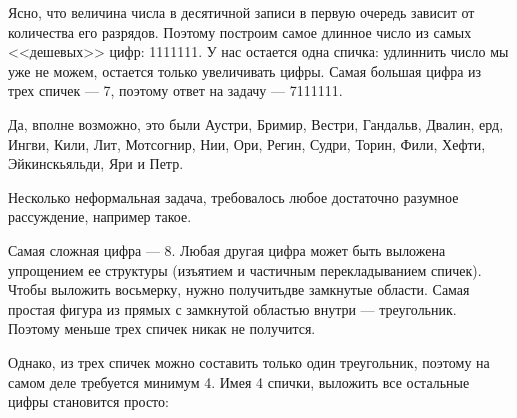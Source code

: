 ﻿
\begin{itemize}
\itA Ясно, что величина числа в десятичной записи в первую очередь зависит от 
количества его разрядов. Поэтому построим самое длинное число из самых
<<дешевых>> цифр: 1111111. У нас остается одна спичка: удлиннить число мы
уже не можем, остается только увеличивать цифры. Самая большая цифра из трех
спичек --- 7, поэтому ответ на задачу --- 7111111.

\itB Да, вполне возможно, это были 
Аустри, Бримир, Вестри, Гандальв, Двалин, 
ерд, Ингви, Кили, Лит, Мотсогнир, 
Нии, Ори, Регин, Судри, Торин,
Фили, Хефти, Эйкинскьяльди, Яри
и Петр.
                                                        
\itC Несколько неформальная задача, требовалось любое достаточно\linebreak
разумное рассуждение, например такое.

Самая сложная цифра --- 8. Любая другая цифра может быть выложена
упрощением ее структуры (изъятием и частичным перекладыванием спичек).
Чтобы выложить восьмерку, нужно получить\linebreak две замкнутые области.
Самая простая фигура из прямых с замкнутой областью внутри --- треугольник.
Поэтому меньше трех спичек никак не получится.

Однако, из трех спичек можно составить только один треугольник, поэтому
на самом деле требуется минимум 4. Имея 4 спички, выложить все
остальные цифры становится просто: \medskip

\begin{center} \end{center}

\end{itemize}
